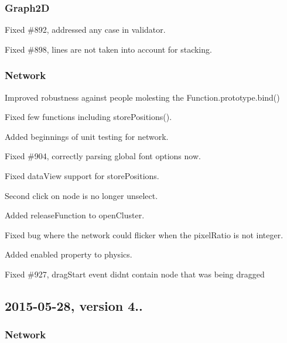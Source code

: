 \subsubsection*{Graph2D}


\begin{DoxyItemize}
\item Fixed \#892, addressed any case in validator.
\item Fixed \#898, lines are not taken into account for stacking.
\end{DoxyItemize}

\subsubsection*{Network}


\begin{DoxyItemize}
\item Improved robustness against people molesting the Function.\+prototype.\+bind()
\item Fixed few functions including store\+Positions().
\item Added beginnings of unit testing for network.
\item Fixed \#904, correctly parsing global font options now.
\item Fixed data\+View support for store\+Positions.
\item Second click on node is no longer unselect.
\item Added release\+Function to open\+Cluster.
\item Fixed bug where the network could flicker when the pixel\+Ratio is not integer.
\item Added enabled property to physics.
\item Fixed \#927, drag\+Start event didn\textquotesingle{}t contain node that was being dragged
\end{DoxyItemize}

\subsection*{2015-\/05-\/28, version 4..}

\subsubsection*{Network}


